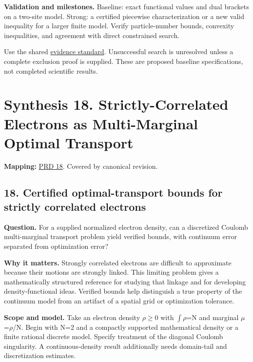 \documentclass[
  11pt,
]{article}
\begin{document}
\textbf{Validation and milestones.} Baseline: exact functional values
and dual brackets on a two-site model. Strong: a certified piecewise
characterization or a new valid inequality for a larger finite model.
Verify particle-number bounds, convexity inequalities, and agreement
with direct constrained search.

Use the shared
\href{https://github.com/rick-stevens-ai/Pure-Thought/blob/main/reviews/EVIDENCE-STANDARD.md}{evidence
standard}. Unsuccessful search is unresolved unless a complete exclusion
proof is supplied. These are proposed baseline specifications, not
completed scientific results.

\section{Synthesis 18. Strictly-Correlated Electrons as Multi-Marginal
Optimal Transport}

\textbf{Mapping:}
\href{https://github.com/rick-stevens-ai/Pure-Thought/blob/main/PRDs/18-Optimal-Transport-Chemistry.md}{PRD
18}. Covered by canonical revision.

\subsection{18. Certified optimal-transport bounds for strictly
correlated electrons}

\textbf{Question.} For a supplied normalized electron density, can a
discretized Coulomb multi-marginal transport problem yield verified
bounds, with continuum error separated from optimization error?

\textbf{Why it matters.} Strongly correlated electrons are difficult to
approximate because their motions are strongly linked. This limiting
problem gives a mathematically structured reference for studying that
linkage and for developing density-functional ideas. Verified bounds
help distinguish a true property of the continuum model from an artifact
of a spatial grid or optimization tolerance.

\textbf{Scope and model.} Take an electron density
\ensuremath{\rho}\ensuremath{\ge}0 with
\ensuremath{\int}\ensuremath{\rho}=N and marginal
\ensuremath{\mu}=\ensuremath{\rho}/N. Begin with N=2 and a compactly
supported mathematical density or a finite rational discrete model.
Specify treatment of the diagonal Coulomb singularity. A
continuous-density result additionally needs domain-tail and
discretization estimates.
\end{document}
